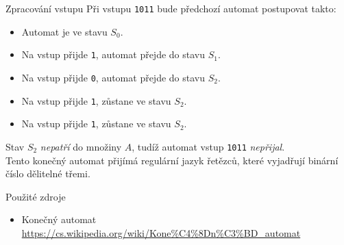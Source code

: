 \documentclass{beamer}
\begin{document}
\begin{frame}{Zpracování vstupu}
Při vstupu \texttt{1011} bude předchozí automat postupovat takto:
\begin{itemize}
    \item {Automat je ve stavu $S_0$.}
    \item {Na vstup přijde \texttt{1}, automat přejde do stavu $S_1$.}
    \item {Na vstup přijde \texttt{0}, automat přejde do stavu $S_2$.}
    \item {Na vstup přijde \texttt{1}, zůstane ve stavu $S_2$.}
    \item {Na vstup přijde \texttt{1}, zůstane ve stavu $S_2$.}
\end{itemize}

Stav $S_2$ \emph{nepatří} do množiny $A$, tudíž automat vstup \texttt{1011} \emph{nepřijal}.\\
\pause
\bigskip
Tento konečný automat přijímá regulární jazyk řetězců, které vyjadřují binární číslo dělitelné třemi.
\end{frame}

\begin{frame}{Použité zdroje}
\begin{itemize}
    \item{Konečný automat \\ 
    \url{https://cs.wikipedia.org/wiki/Kone\%C4\%8Dn\%C3\%BD_automat}}
\end{itemize}
\end{frame}
\end{document}
